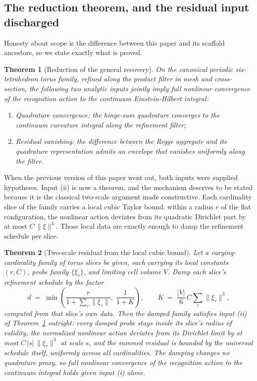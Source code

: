 \documentclass[11pt,letterpaper]{article}
\newtheorem{theorem}{Theorem}[section]
\theoremstyle{definition}
\begin{document}
\subsection{The reduction theorem, and the residual input discharged}
\label{sec:reduction}

Honesty about scope is the difference between this paper and its
scaffold ancestors, so we state exactly what is proved.

\begin{theorem}[Reduction of the general recovery]\label{thm:d2red}
On the canonical periodic six-tetrahedron torus family, refined along
the product filter in mesh and cross-section, the following two
analytic inputs jointly imply full nonlinear convergence of the
recognition action to the continuum Einstein-Hilbert integral:
\begin{enumerate}[nosep,label=\textup{(\roman*)}]
\item \emph{Quadrature convergence:} the hinge-sum quadrature converges
to the continuum curvature integral along the refinement filter;
\item \emph{Residual vanishing:} the difference between the Regge
aggregate and its quadrature representation admits an envelope that
vanishes uniformly along the filter.
\end{enumerate}
\end{theorem}

When the previous version of this paper went out, both inputs were
supplied hypotheses.  Input (ii) is now a theorem, and the mechanism
deserves to be stated because it is the classical two-scale argument
made constructive.  Each cardinality slice of the family carries a
local cubic Taylor bound: within a radius $r$ of the flat
configuration, the nonlinear action deviates from its quadratic
Dirichlet part by at most $C\,\|\xi\|^3$.  Those local data are
exactly enough to damp the refinement schedule per slice.

\begin{theorem}[Two-scale residual from the local cubic bound]
\label{thm:damped}
Let a varying-cardinality family of torus slices be given, each
carrying its local constants $(r, C)$, probe family $\{\xi_\tau\}$,
and limiting cell volume $V$.  Damp each slice's refinement schedule
by the factor
\begin{equation}\label{eq:damping}
d \;=\; \min\!\left(
\frac{r}{1+\sum_\tau\|\xi_\tau\|},\;
\frac{1}{1+K}\right),
\qquad
K \;=\; \frac{|V|}{6}\,C\sum_\tau\|\xi_\tau\|^{3},
\end{equation}
computed from that slice's own data.  Then the damped family satisfies
input (ii) of Theorem~\ref{thm:d2red} outright: every damped probe
stays inside its slice's radius of validity, the normalized nonlinear
action deviates from its Dirichlet limit by at most $C\,|s|\,
\|\xi_\tau\|^3$ at scale $s$, and the summed residual is bounded by
the universal schedule itself, uniformly across all cardinalities.
The damping changes no quadrature proxy, so full nonlinear convergence
of the recognition action to the continuum integral holds given input
(i) alone.
\end{theorem}
\end{document}
